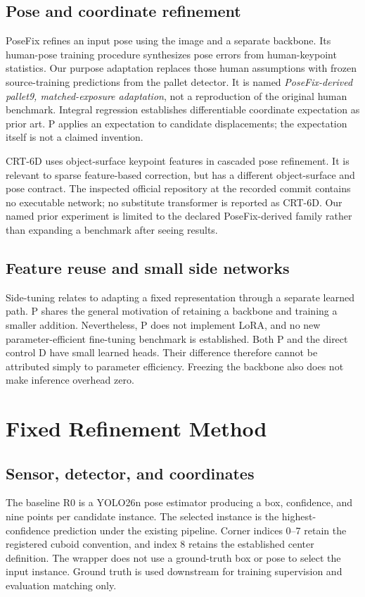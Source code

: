 \documentclass[journal]{IEEEtran}
\begin{document}
\subsection{Pose and coordinate refinement}
PoseFix\cite{posefix} refines an input pose using the image and a separate backbone. Its human-pose training procedure synthesizes pose errors from human-keypoint statistics. Our purpose adaptation replaces those human assumptions with frozen source-training predictions from the pallet detector. It is named \emph{PoseFix-derived pallet9, matched-exposure adaptation}, not a reproduction of the original human benchmark. Integral regression\cite{integral} establishes differentiable coordinate expectation as prior art. P applies an expectation to candidate displacements; the expectation itself is not a claimed invention.

CRT-6D\cite{crt} uses object-surface keypoint features in cascaded pose refinement. It is relevant to sparse feature-based correction, but has a different object-surface and pose contract. The inspected official repository at the recorded commit contains no executable network; no substitute transformer is reported as CRT-6D. Our named prior experiment is limited to the declared PoseFix-derived family rather than expanding a benchmark after seeing results.

\subsection{Feature reuse and small side networks}
Side-tuning\cite{side} relates to adapting a fixed representation through a separate learned path. P shares the general motivation of retaining a backbone and training a smaller addition. Nevertheless, P does not implement LoRA, and no new parameter-efficient fine-tuning benchmark is established. Both P and the direct control D have small learned heads. Their difference therefore cannot be attributed simply to parameter efficiency. Freezing the backbone also does not make inference overhead zero.

\section{Fixed Refinement Method}
\subsection{Sensor, detector, and coordinates}
The baseline R0 is a YOLO26n pose estimator producing a box, confidence, and nine points per candidate instance. The selected instance is the highest-confidence prediction under the existing pipeline. Corner indices 0--7 retain the registered cuboid convention, and index 8 retains the established center definition. The wrapper does not use a ground-truth box or pose to select the input instance. Ground truth is used downstream for training supervision and evaluation matching only.
\end{document}
